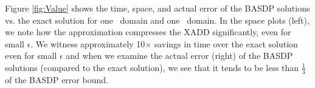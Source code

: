 Figure \ref{fig:Value} shows the time, space, and actual error of the
BASDP solutions vs. the exact solution for one \MarsRoverBi\ domain and one 
\Invent\ domain.  In the space plots (left), we note how the
approximation compresses the XADD significantly, even for small
$\epsilon$.  We witness approximately 10$\times$ savings in time over
the exact solution even for small $\epsilon$ and when we examine the
actual error (right) of the BASDP solutions (compared to the exact
solution), we see that it tends to be less than
$\frac{1}{3}$ of the BASDP error bound.

